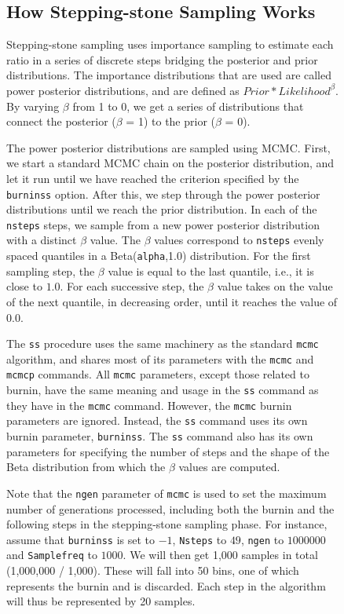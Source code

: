 \documentclass[12pt]{book}
\newcommand{\ttt}[1]{\texttt{#1}}
\begin{document}
\begin{figure}[h]
\subsection{How Stepping-stone Sampling Works}

Stepping-stone sampling uses importance sampling to estimate each ratio in a series of discrete
steps bridging the posterior and prior distributions. The importance distributions that are used
are called power posterior distributions, and are defined as $Prior*Likelihood^{\beta}$. By varying
$\beta$ from 1 to 0, we get a series of distributions that connect the posterior ($\beta$ = 1) to
the prior ($\beta$ = 0).

The power posterior distributions are sampled using MCMC. First, we start a standard MCMC chain on
the posterior distribution, and let it run until we have reached the criterion specified by the
\ttt{burninss} option. After this, we step through the power posterior distributions until we reach
the prior distribution. In each of the \ttt{nsteps} steps, we sample from a new power posterior
distribution with a distinct $\beta$ value. The $\beta$ values correspond to \ttt{nsteps} evenly
spaced quantiles in a Beta(\ttt{alpha},1.0) distribution. For the first sampling step, the $\beta$
value is equal to the last quantile, i.e., it is close to $1.0$. For each successive step, the
$\beta$ value takes on the value of the next quantile, in decreasing order, until it reaches the
value of $0.0$.

The \ttt{ss} procedure uses the same machinery as the standard \ttt{mcmc} algorithm, and shares
most of its parameters with the \ttt{mcmc} and \ttt{mcmcp} commands. All \ttt{mcmc} parameters,
except those related to burnin, have the same meaning and usage in the \ttt{ss} command as they
have in the \ttt{mcmc} command. However, the \ttt{mcmc} burnin parameters are ignored. Instead, the
\ttt{ss} command uses its own burnin parameter, \ttt{burninss}. The \ttt{ss} command also has its
own parameters for specifying the number of steps and the shape of the Beta distribution from which
the $\beta$ values are computed.

Note that the \ttt{ngen} parameter of \ttt{mcmc} is used to set the maximum number of generations
processed, including both the burnin and the following steps in the stepping-stone sampling phase.
For instance, assume that \ttt{burninss} is set to $-1$, \ttt{Nsteps} to $49$, \ttt{ngen} to
$1000000$ and \ttt{Samplefreq} to $1000$. We will then get 1,000 samples in total (1,000,000 /
1,000). These will fall into 50 bins, one of which represents the burnin and is discarded. Each
step in the algorithm will thus be represented by 20 samples.


\end{figure}
\end{document}
